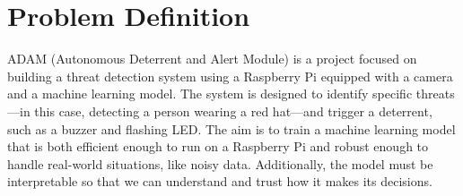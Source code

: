 \section{Problem Definition}
ADAM (Autonomous Deterrent and Alert Module) is a project focused on building a threat detection system using a Raspberry Pi equipped with a camera and a machine learning model.
 The system is designed to identify specific threats—in this case, detecting a person wearing a red hat—and trigger a deterrent, such as a buzzer and flashing LED.
The aim is to train a machine learning model that is both efficient enough to run on a Raspberry Pi and robust enough to handle real-world situations, like noisy data. 
Additionally, the model must be interpretable so that we can understand and trust how it makes its decisions.